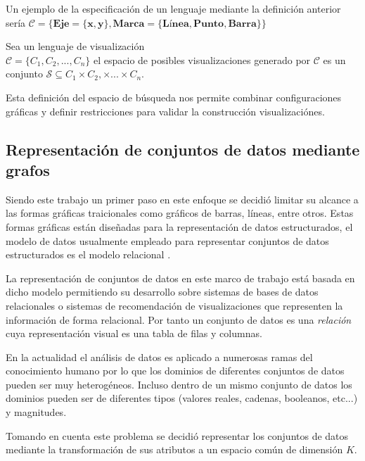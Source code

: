 Un ejemplo de la especificaci\'on de un lenguaje mediante la definici\'on anterior
ser\'ia $\mathcal{C} = \{ \textbf{Eje} = \{ \textbf{x}, \textbf{y} \}, 
\textbf{Marca} = \{ \textbf{L\'inea}, \textbf{Punto}, \textbf{Barra} \} \}$

\begin{definition}
    Sea un lenguaje de visualizaci\'on \\ $\mathcal{C} = \{ C_1, C_2, ..., C_n \}$
    el espacio de posibles visualizaciones generado por $\mathcal{C}$ es un
    conjunto $\mathcal{S} \subseteq C_1 \times C_2, \times ... \times C_n$.
\end{definition}

Esta definici\'on del espacio de b\'usqueda nos permite combinar configuraciones gr\'aficas y definir restricciones para
validar la construcci\'on visualizaci\'ones.

\subsection{Representaci\'on de conjuntos de datos mediante grafos}

Siendo este trabajo un primer paso en este enfoque se decidi\'o limitar su alcance
a las formas gr\'aficas traicionales como gr\'aficos de barras, l\'ineas, entre otros. Estas formas
gr\'aficas est\'an dise\~nadas para la representaci\'on de datos estructurados, el modelo de 
datos usualmente empleado para representar conjuntos de datos estructurados es el modelo relacional \cite{codd1970relational}.

La representaci\'on de conjuntos de datos en este marco de trabajo est\'a basada en dicho modelo permitiendo su
desarrollo sobre sistemas de bases de datos relacionales o sistemas de recomendaci\'on de visualizaciones que representen
la informaci\'on de forma relacional. Por tanto un conjunto de datos es una \textit{relaci\'on} cuya
representaci\'on visual es una tabla de filas y columnas.

En la actualidad el an\'alisis de datos es aplicado a numerosas
ramas del conocimiento humano por lo
que los dominios de diferentes conjuntos de datos pueden ser muy heterog\'eneos.
Incluso dentro de un mismo conjunto de datos los dominios pueden ser de
diferentes tipos (valores reales, cadenas, booleanos, etc...) y magnitudes.

Tomando en cuenta este problema se decidi\'o representar los conjuntos de datos
mediante la transformaci\'on de sus atributos a un espacio com\'un de dimensi\'on $K$.

